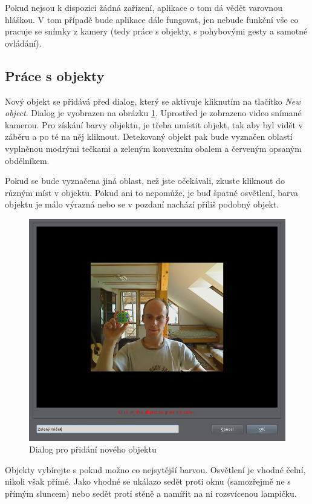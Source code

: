 Pokud nejsou k dispozici žádná zařízení, aplikace o tom dá vědět varovnou
hláškou. V tom případě bude aplikace dále fungovat, jen nebude funkční vše co
pracuje se snímky z kamery (tedy práce s objekty, s pohybovými gesty a samotné
ovládání).

\subsection{Práce s objekty}
Nový objekt se přidává před dialog, který se aktivuje kliknutím na tlačítko
\emph{New object}. Dialog je vyobrazen na obrázku \ref{fig:newobject}. Uprostřed je zobrazeno
video snímané kamerou. Pro získání barvy objektu, je třeba umístit objekt, tak
aby byl vidět v záběru a po té na něj kliknout. Detekovaný objekt pak bude
vyznačen oblastí vyplněnou modrými tečkami a zeleným konvexním obalem a
červeným opsaným obdélníkem.

Pokud se bude vyznačena jiná oblast, než jste očekávali, zkuste kliknout do
různým míst v objektu. Pokud ani to nepomůže, je buď špatné osvětlení, barva
objektu je málo výrazná nebo se v pozdaní nachází příliš podobný objekt.

\begin{figure}[h]
\centering
\includegraphics[width=\textwidth]{newobject.png}
\caption{Dialog pro přidání nového objektu}
\label{fig:newobject}
\end{figure}

Objekty vybírejte s pokud možno co nejsytější barvou. Osvětlení je vhodné
čelní, nikoli však přímé. Jako vhodné se ukálazo sedět proti oknu (samozřejmě
ne s přímým sluncem) nebo sedět proti stěně a namířit na ni rozsvícenou
lampičku.

